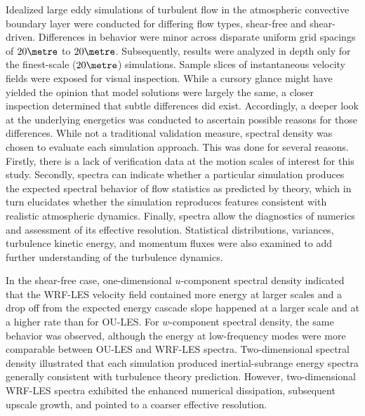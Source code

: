 Idealized large eddy simulations of turbulent flow in the atmospheric convective boundary layer were conducted for differing flow types, shear-free and shear-driven. Differences in behavior were minor across disparate uniform grid spacings of $20 \metre$ to $20 \metre$. Subsequently, results were analyzed in depth only for the finest-scale ($20\metre$) simulations. Sample slices of instantaneous velocity fields were exposed for visual inspection. While a cursory glance might have yielded the opinion that model solutions were largely the same, a closer inspection determined that subtle differences did exist. Accordingly, a deeper look at the underlying energetics was conducted to ascertain possible reasons for those differences. While not a traditional validation measure, spectral density was chosen to evaluate each simulation approach. This was done for several reasons. Firstly, there is a lack of verification data at the motion scales of interest for this study. Secondly, spectra can indicate whether a particular simulation produces the expected spectral behavior of flow statistics as predicted by theory, which in turn elucidates whether the simulation reproduces features consistent with realistic atmospheric dynamics. Finally, spectra allow the diagnostics of numerics and assessment of its effective resolution. Statistical distributions, variances, turbulence kinetic energy, and momentum fluxes were also examined to add further understanding of the turbulence dynamics.

In the shear-free case, one-dimensional $u$-component spectral density indicated that the WRF-LES velocity field contained more energy at larger scales and a drop off from the expected energy cascade slope happened at a larger scale and at a higher rate than for OU-LES. For $w$-component spectral density, the same behavior was observed, although the energy at low-frequency modes were more comparable between OU-LES and WRF-LES spectra. Two-dimensional spectral density illustrated that each simulation produced inertial-subrange energy spectra generally consistent with turbulence theory prediction. However, two-dimensional WRF-LES spectra exhibited the enhanced numerical dissipation, subsequent upscale growth, and pointed to a coarser effective resolution. 

